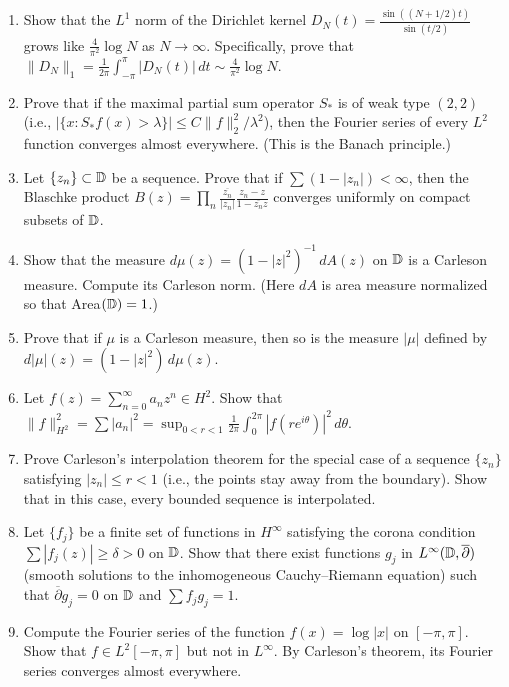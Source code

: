\begin{enumerate}
    \item [I] Show that the \(L^1\) norm of the Dirichlet kernel \(D_N(t) = \frac{\sin((N+1/2)t)}{\sin(t/2)}\) grows like \(\frac{4}{\pi^2} \log N\) as \(N \to \infty\). Specifically, prove that \(\|D_N\|_1 = \frac{1}{2\pi} \int_{-\pi}^\pi |D_N(t)|\,dt \sim \frac{4}{\pi^2} \log N\).
    \item [I] Prove that if the maximal partial sum operator \(S_*\) is of weak type \((2,2)\) (i.e., \(|\{x : S_* f(x) > \lambda\}| \leq C \|f\|_2^2/\lambda^2\)), then the Fourier series of every \(L^2\) function converges almost everywhere. (This is the Banach principle.)
    \item [B] Let \(\{z_n\} \subset \mathbb{D}\) be a sequence. Prove that if \(\sum (1-|z_n|) < \infty\), then the Blaschke product \(B(z) = \prod_n \frac{\overline{z_n}}{|z_n|} \frac{z_n - z}{1 - \overline{z_n}z}\) converges uniformly on compact subsets of \(\mathbb{D}\).
    \item [B] Show that the measure \(d\mu(z) = (1-|z|^2)^{-1}\,dA(z)\) on \(\mathbb{D}\) is a Carleson measure. Compute its Carleson norm. (Here \(dA\) is area measure normalized so that Area\((\mathbb{D}) = 1\).)
    \item [I] Prove that if \(\mu\) is a Carleson measure, then so is the measure \(|\mu|\) defined by \(d|\mu|(z) = (1-|z|^2)\,d\mu(z)\).
    \item [B] Let \(f(z) = \sum_{n=0}^\infty a_n z^n \in H^2\). Show that \(\|f\|_{H^2}^2 = \sum |a_n|^2 = \sup_{0<r<1} \frac{1}{2\pi} \int_0^{2\pi} |f(re^{i\theta})|^2\,d\theta\).
    \item [B] Prove Carleson's interpolation theorem for the special case of a sequence \(\{z_n\}\) satisfying \(|z_n| \leq r < 1\) (i.e., the points stay away from the boundary). Show that in this case, every bounded sequence is interpolated.
    \item [A] Let \(\{f_j\}\) be a finite set of functions in \(H^\infty\) satisfying the corona condition \(\sum |f_j(z)| \geq \delta > 0\) on \(\mathbb{D}\). Show that there exist functions \(g_j\) in \(L^\infty(\mathbb{D}, \overline{\partial})\) (smooth solutions to the inhomogeneous Cauchy--Riemann equation) such that \(\overline{\partial} g_j = 0\) on \(\mathbb{D}\) and \(\sum f_j g_j = 1\).
    \item [B] Compute the Fourier series of the function \(f(x) = \log|x|\) on \([-\pi,\pi]\). Show that \(f \in L^2[-\pi,\pi]\) but not in \(L^\infty\). By Carleson's theorem, its Fourier series converges almost everywhere.

\end{enumerate}
